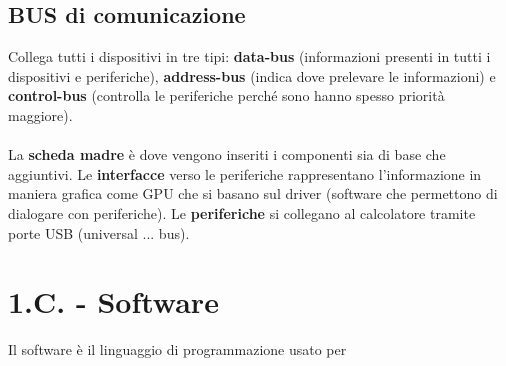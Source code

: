 \documentclass[10pt]{article}
\begin{document}
\subsection*{BUS di comunicazione}
Collega tutti i dispositivi in tre tipi: \textbf{data-bus} (informazioni presenti in tutti i dispositivi e periferiche), \textbf{address-bus} (indica dove prelevare le informazioni) e \textbf{control-bus} (controlla le periferiche perché sono hanno spesso priorità maggiore).\\
\\
La \textbf{scheda madre} è dove vengono inseriti i componenti sia di base che aggiuntivi.
Le \textbf{interfacce} verso le periferiche rappresentano l'informazione in maniera grafica come GPU che si basano sul driver (software che permettono di dialogare con periferiche). 
Le \textbf{periferiche} si collegano al calcolatore tramite porte USB (universal ... bus). \\
\section*{1.C. - Software}
Il software è il linguaggio di programmazione usato per 
\end{document}
